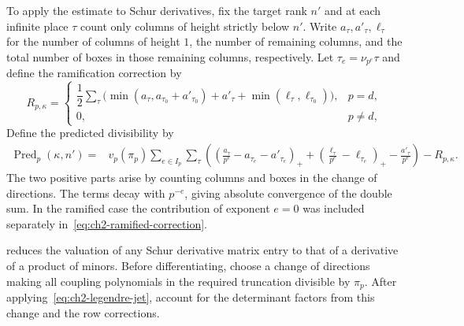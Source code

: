 To apply the estimate to Schur derivatives, fix the target rank $n'$ and at each infinite place $\tau$ count only columns of height strictly below $n'$. Write $a_\tau,a'_\tau,\ell_\tau$ for the number of columns of height $1$, the number of remaining columns, and the total number of boxes in those remaining columns, respectively. Let $\tau_e=\nu_{p^e}\tau$ and define the ramification correction by
\begin{equation}
\label{eq:ch2-ramified-correction}
 R_{p,\kappa}
 =\begin{cases}
 \dfrac12\displaystyle\sum_\tau
 \bigl(\min(a_\tau,a_{\tau_0}+a'_{\tau_0})+a'_\tau+
                 \min(\ell_\tau,\ell_{\tau_0})\bigr),&p=d,\\[4pt]
 0,&p\ne d,
 \end{cases}
\end{equation}
Define the predicted divisibility by
\begin{equation}
\label{eq:ch2-predicted-divisibility}
\begin{aligned}
 \operatorname{Pred}_p(\kappa,n')={}&v_p(\pi_p)\sum_{e\in I_p}\sum_\tau
    \left(
      \left(\frac{a_\tau}{p^e}-a_{\tau_e}-a'_{\tau_e}\right)_+
     +\left(\frac{\ell_\tau}{p^e}-\ell_{\tau_e}\right)_+
     -\frac{a'_\tau}{p^e}
    \right)-R_{p,\kappa}.
\end{aligned}
\end{equation}
The two positive parts arise by counting columns and boxes in the change of directions. The terms decay with $p^{-e}$, giving absolute convergence of the double sum. In the ramified case the contribution of exponent $e=0$ was included separately in~\eqref{eq:ch2-ramified-correction}.

 reduces the valuation of any Schur derivative matrix entry to that of a derivative of a product of minors. Before differentiating, choose a change of directions making all coupling polynomials in the required truncation divisible by $\pi_p$. After applying~\eqref{eq:ch2-legendre-jet}, account for the determinant factors from this change and the row corrections.

